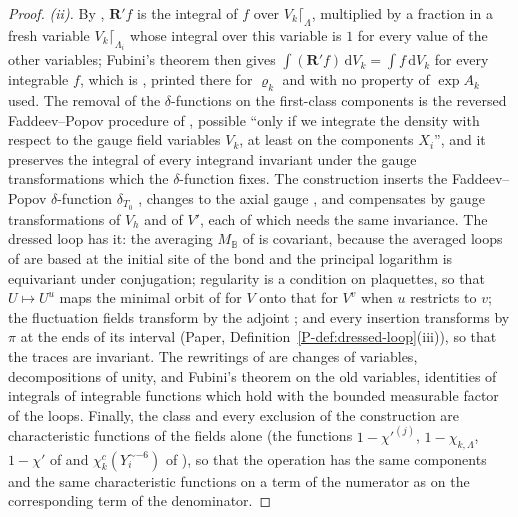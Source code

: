 \documentclass[11pt]{preprint}
\newcommand{\dd}{\mathrm{d}}
\numberwithin{equation}{section}
\theoremstyle{definition}
\theoremstyle{remark}
\theoremstyle{plain}
\begin{document}
\begin{proof}
\emph{(ii).} By \cite[(1.100), p.~201]{BalabanLFR1}, $\mathbf R'f$ is the integral of $f$ over $V_k\lceil_\Lambda$, multiplied by a fraction in a fresh variable $V_k\lceil_{\Lambda_i}$ whose integral over this variable is $1$ for every value of the other variables; Fubini's theorem then gives $\int(\mathbf R'f)\,\dd V_k = \int f\,\dd V_k$ for every integrable $f$, which is \cite[(1.102)]{BalabanLFR1}, printed there for $\varrho_k$ and with no property of $\exp A_k$ used. The removal of the $\delta$-functions on the first-class components is the reversed Faddeev--Popov procedure of \cite[p.~378]{BalabanLFR2}, possible ``only if we integrate the density with respect to the gauge field variables $V_k$, at least on the components $X_i$'', and it preserves the integral of every integrand invariant under the gauge transformations which the $\delta$-function fixes. The construction inserts the Faddeev--Popov $\delta$-function $\delta_{T_0}$ \cite[pp.~195--196]{BalabanLFR1}, changes to the axial gauge \cite[p.~197]{BalabanLFR1}, and compensates by gauge transformations of $V_h$ and of $V'$, each of which needs the same invariance. The dressed loop has it: the averaging $M_{\mathbb B}$ of \cite[(2.11), p.~256]{BalabanCRE} is covariant, because the averaged loops of \cite[(0.4), p.~253]{BalabanRG1} are based at the initial site of the bond and the principal logarithm is equivariant under conjugation; regularity is a condition on plaquettes, so that $U \mapsto U^u$ maps the minimal orbit of \cite[(2.12)]{BalabanCRE} for $V$ onto that for $V^v$ when $u$ restricts to $v$; the fluctuation fields transform by the adjoint \cite[(2.41)(iii), p.~261]{BalabanCRE}; and every insertion transforms by $\pi$ at the ends of its interval (Paper, Definition~\ref{P-def:dressed-loop}(iii)), so that the traces are invariant. The rewritings of \cite[pp.~190--193]{BalabanLFR1} are changes of variables, decompositions of unity, and Fubini's theorem on the old variables, identities of integrals of integrable functions which hold with the bounded measurable factor of the loops. Finally, the class and every exclusion of the construction are characteristic functions of the fields alone (the functions $1 - \chi'^{(j)}$, $1 - \chi_{k,\Lambda}$, $1 - \chi'$ of \cite[(1.55), p.~188; (1.75), p.~193; (1.82), p.~196]{BalabanLFR1} and $\chi^c_k(Y_i^{\sim-6})$ of \cite[(1.72)]{BalabanLFR2}), so that the operation has the same components and the same characteristic functions on a term of the numerator as on the corresponding term of the denominator.


\end{proof}
\end{document}
